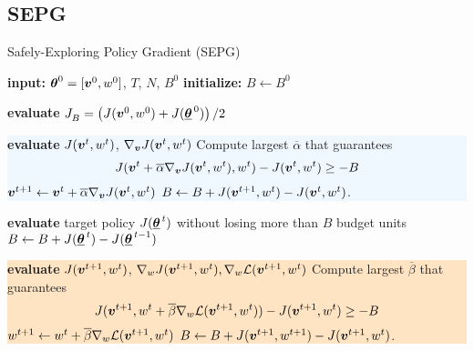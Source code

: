 \subsection{SEPG}
\begin{algorithm}[t]
\caption{Safely-Exploring Policy Gradient (SEPG)}
    \label{alg:adaptive_exp}
    \begin{algorithmic}[1] 
	\State \textbf{input:} $\vtheta^0 = [\vv^0, w^0]$, $T$, $N$, $B^0$
        \State \textbf{initialize:} $B \gets B^0$
        
        \State \textbf{evaluate} $\jbase[] = \left(J(\vv^0, w^0) + J(\vtarget[0])\right) / 2$
			\State\newline
			\hspace*{-\fboxsep}\colorbox{aliceblue}{\parbox{\linewidth}{
            \State \textbf{evaluate} $J(\vv^t,w^t)$, $\nabla_{\vv}{J(\vv^t,w^t)}$
			\State Compute largest $\overline{\alpha}$ that guarantees \[J(\vv^t + \overline{\alpha} \nabla_{\vv}J(\vv^t, w^t), w^t) - J(\vv^t, w^t) \geq -B\]
            \State $\vv^{t+1} \gets \vv^t + \overline{\alpha}\nabla_{\vv}{J(\vv^t, w^t)}$  
           \State $B \gets B + J(\vv^{t+1}, w^t) - J(\vv^t, w^t)$.}}
\newline
			\hspace*{-\fboxsep}\colorbox{teagreen}{\parbox{\linewidth}{
	            \State \textbf{evaluate} target policy $J(\vtarget)$ without losing more than $B$ budget units \label{alg:evaluatetarget}
    		        \State $B \gets B + J(\vtarget) - J(\vtarget[t-1])$ 
        		 \EndIf   }}
      \State\newline
\hspace*{-\fboxsep}\colorbox{bisque}{\parbox{\linewidth}{      
            \State \textbf{evaluate} $J(\vv^{t+1}, w^t)$, $\nabla_{w}{J(\vv^{t+1}, w^t)}, \gradDelta(\vv^{t+1},w^t)$ \label{alg:evaluate2}
            \State Compute largest $\overline{\beta}$ that guarantees \[J(\vv^{t+1}, w^t + \overline{\beta} \gradDelta(\vv^{t+1}, w^t)) - J(\vv^{t+1}, w^t) \geq -B \]
            \State $w^{t+1} \gets w^t + \overline{ \beta}\gradDelta(\vv^{t+1},w^t)$             
            \State $B \gets B + J(\vv^{t+1}, w^{t+1}) - J(\vv^{t+1}, w^t)$. }}
        \EndFor
    \end{algorithmic}
\end{algorithm}

